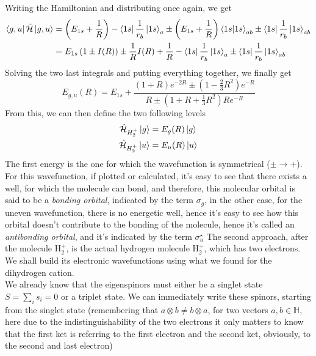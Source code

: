 \documentclass[../qm.tex]{subfiles}
\begin{document}
	Writing the Hamiltonian and distributing once again, we get
	\begin{equation}
		\begin{aligned}
			\bra{g,u}\hat{\mathcal{H}}\ket{g,u}&=\left( E_{1s}+\frac{1}{R} \right)-\bra{1s}\frac{1}{r_b}\ket{1s}_a\pm\left( E_{1s}+\frac{1}{R} \right)\bra{1s}\ket{1s}_{ab}\pm\bra{1s}\frac{1}{r_b}\ket{1s}_{ab}\\
			&=E_{1s}\left( 1\pm I(R) \right)\pm\frac{1}{R}I(R)+\frac{1}{R}-\bra{1s}\frac{1}{r_b}\ket{1s}_a\pm\bra{1s}\frac{1}{r_b}\ket{1s}_{ab}
		\end{aligned}
		\label{eq:numeratorh2pluscalc}
	\end{equation}
	Solving the two last integrals and putting everything together, we finally get
	\begin{equation}
	E_{g,u}(R)=E_{1s}+\frac{(1+R)e^{-2R}\pm\left( 1-\frac{2}{3}R^2 \right)e^{-R}}{R\pm\left( 1+R+\frac{1}{3}R^2 \right)Re^{-R}}
		\label{eq:h2plusenergy}
	\end{equation}
	From this, we can then define the two following levels
	\begin{equation*}
		\begin{aligned}
			\hat{\mathcal{H}}_{H_2^+}\ket{g}&=E_g(R)\ket{g}\\
			\hat{\mathcal{H}}_{H_2^+}\ket{u}&=E_u(R)\ket{u}
		\end{aligned}
	\end{equation*}
	The first energy is the one for which the wavefunction is symmetrical ($\pm\to+$). For this wavefunction, if plotted or calculated, it's easy to see that there exists a well, for which the molecule can bond, and therefore, this molecular orbital is said to be a \textit{bonding orbital}, indicated by the term $\sigma_g$, in the other case, for the uneven wavefunction, there is no energetic well, hence it's easy to see how this orbital doesn't contribute to the bonding of the molecule, hence it's called an \textit{antibonding orbital}, and it's indicated by the term $\sigma_u^\star$
	The second approach, after the molecule $\mathrm{H}_2^+$, is the actual hydrogen molecule $\mathrm{H}_2^+$, which has two electrons.\\
	We shall build its electronic wavefunctions using what we found for the dihydrogen cation.\\
	We already know that the eigenspinors must either be a singlet state $S=\sum_is_i=0$ or a triplet state. We can immediately write these spinors, starting from the singlet state (remembering that $a\otimes b\ne b\otimes a$, for two vectors $a,b\in\mathbb{H}$, here due to the indistinguishability of the two electrons it only matters to know that the first ket is referring to the first electron and the second ket, obviously, to the second and last electron)
\end{document}
